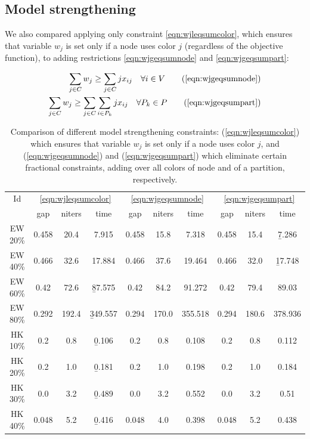 \subsection{Model strengthening}

We also compared applying only constraint \ref{eqn:wjleqsumcolor}, which ensures that variable $w_j$ is set only if a node uses color $j$ (regardless of the objective function), to adding restrictions \ref{eqn:wjgeqsumnode} and \ref{eqn:wjgeqsumpart}:

\begin{align*}
\sum_{j \in C} w_j \geq \sum_{j \in C} j x_{ij} \quad \forall i \in V \tag{\ref{eqn:wjgeqsumnode}} \\
\sum_{j \in C} w_j \geq \sum_{j \in C} \sum_{i \in P_k} j x_{ij} \quad \forall P_k \in P \tag{\ref{eqn:wjgeqsumpart}}
\end{align*}

\begin{table}
\centering

\begin{tabular}{|c|ccc|ccc|ccc|}
\hline
\multicolumn{1}{|c|}{Id} & \multicolumn{3}{|c|}{\ref{eqn:wjleqsumcolor}} & \multicolumn{3}{|c|}{\ref{eqn:wjgeqsumnode}} & \multicolumn{3}{|c|}{\ref{eqn:wjgeqsumpart}}
\\
 & gap & niters & time & gap & niters & time & gap & niters & time
\\
\hline
EW 20\% & 0.458 & 20.4 & 7.915 & 0.458 & 15.8 & 7.318 & 0.458 & 15.4 & \b{7.286}
\\
EW 40\% & 0.466 & 32.6 & 17.884 & 0.466 & 37.6 & 19.464 & 0.466 & 32.0 & \b{17.748}
\\
EW 60\% & 0.42 & 72.6 & \b{87.575} & 0.42 & 84.2 & 91.272 & 0.42 & 79.4 & 89.03
\\
EW 80\% & 0.292 & 192.4 & \b{349.557} & 0.294 & 170.0 & 355.518 & 0.294 & 180.6 & 378.936
\\
\hline
HK 10\% &  0.2 &  0.8 & \b{0.106} &  0.2 &  0.8 & 0.108 &  0.2 &  0.8 & 0.112
\\
HK 20\% &  0.2 &  1.0 & \b{0.181} &  0.2 &  1.0 & 0.198 &  0.2 &  1.0 & 0.184
\\
HK 30\% &  0.0 &  3.2 & \b{0.489} &  0.0 &  3.2 & 0.552 &  0.0 &  3.2 & 0.51
\\
HK 40\% & 0.048 &  5.2 & \b{0.416} & 0.048 &  4.0 & 0.398 & 0.048 &  5.2 & 0.438
\\
\hline 
 \end{tabular}

\caption{Comparison of different model strengthening constraints: (\ref{eqn:wjleqsumcolor}) which ensures that variable $w_j$ is set only if a node uses color $j$, and (\ref{eqn:wjgeqsumnode}) and (\ref{eqn:wjgeqsumpart}) which eliminate certain fractional constraints, adding over all colors of node and of a partition, respectively.}

\label{table:models:colorbound}

\end{table}


